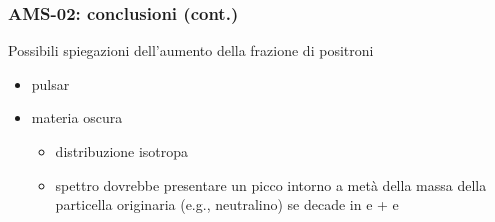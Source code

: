 \documentclass[10pt]{beamer}
\newcommand{\con}{\color{alerted text.fg}{\ding{55}}}
\begin{document}
\begin{frame}
  \frametitle{AMS-02: conclusioni (cont.)}
  Possibili spiegazioni dell'aumento della frazione di positroni
  \begin{itemize}
  \item<+-> pulsar
  \item<+-> materia oscura
    \begin{itemize}
    \item[\con] distribuzione isotropa
    \item[\con] spettro dovrebbe presentare un picco intorno a metà della massa
      della particella originaria (e.g., neutralino) se decade in e\ap{+} +
      e\ap{-}
    \end{itemize}
  \end{itemize}
\end{frame}

\section{\refname}

\begin{frame}
  \frametitle{\refname{}}
  \printbibliography{}
\end{frame}
\end{document}
